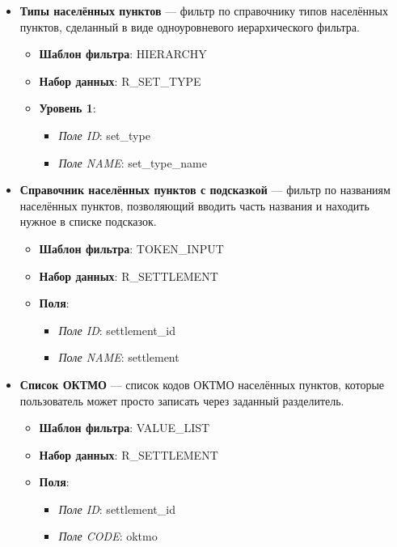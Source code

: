 \documentclass[../user-manual.tex]{subfiles}
\begin{document}
	\begin{boxed}
		\begin{itemize}
			\item \textbf{Типы населённых пунктов} --- фильтр по справочнику типов населённых пунктов, сделанный в виде одноуровневого иерархического фильтра.
			
				\begin{itemize}
				\item \textbf{Шаблон фильтра}: HIERARCHY
				\item \textbf{Набор данных}: R\_SET\_TYPE
				\item \textbf{Уровень 1}:
					\begin{itemize}
						\item \textit{Поле ID}: set\_type
						\item \textit{Поле NAME}: set\_type\_name
					\end{itemize}
				
				\end{itemize}
			
			\item \textbf{Справочник населённых пунктов с подсказкой} --- фильтр по названиям населённых пунктов, позволяющий вводить часть названия и находить нужное в списке подсказок.

				\begin{itemize}
					\item \textbf{Шаблон фильтра}: TOKEN\_INPUT
					\item \textbf{Набор данных}: R\_SETTLEMENT
					\item \textbf{Поля}:
					\begin{itemize}
						\item \textit{Поле ID}: settlement\_id
						\item \textit{Поле NAME}: settlement
					\end{itemize}
					
				\end{itemize}
			
			
			\item \textbf{Список ОКТМО} --- список кодов ОКТМО населённых пунктов, которые пользователь может просто записать через заданный разделитель.
			
				\begin{itemize}
					\item \textbf{Шаблон фильтра}: VALUE\_LIST
					\item \textbf{Набор данных}: R\_SETTLEMENT
					\item \textbf{Поля}:
					\begin{itemize}
						\item \textit{Поле ID}: settlement\_id
						\item \textit{Поле CODE}: oktmo
					\end{itemize}
					
				\end{itemize}			
			
		\end{itemize}
	\end{boxed}
\end{document}
